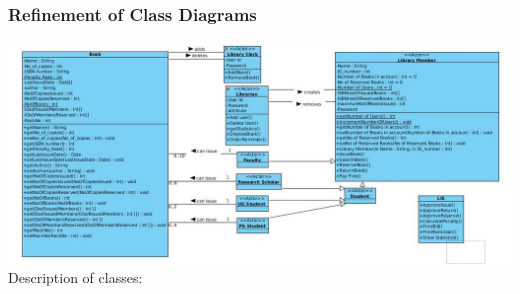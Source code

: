 \documentclass[a4paper]{article}
\begin{document}
\subsubsection{Refinement of Class Diagrams}
\includegraphics[scale=0.35]{images/classDiagFinal.jpg}
\\
Description of classes:
\\
\end{document}
